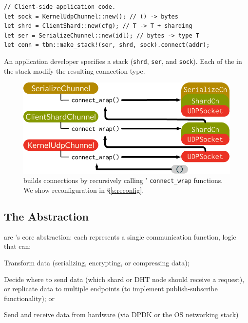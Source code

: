 \begin{listing}[t!]
\begin{verbatim}
// Client-side application code.
let sock = KernelUdpChunnel::new(); // () -> bytes
let shrd = ClientShard::new(cfg); // T -> T + sharding
let ser = SerializeChunnel::new(idl); // bytes -> type T
let conn = tbm::make_stack!(ser, shrd, sock).connect(addr);
\end{verbatim}
\vspace{-12pt}
\caption{An application developer specifies a \tunnel stack (\texttt{shrd}, \texttt{ser}, and \texttt{sock}). Each of the \tunnels in the stack modify the resulting connection type.}
\label{l:chunnel-stack}
\vspace{-10pt}
\end{listing}
\begin{figure}
    \centering
    \includegraphics[width=\columnwidth]{img/chunnel-panda-proposal}
    \vspace{2pt}
    \caption{\name builds connections by recursively calling \tunnels' \texttt{connect\_wrap} functions. We show reconfiguration in \S\ref{s:reconfig}.}
    \label{f:chunnel}
\end{figure}

\subsection{The \tunnel Abstraction}\label{s:chunnel}
\tunnels are \name's core abstraction: each \tunnel represents a single communication function, \ie logic that can:
\begin{inparaenum}[(a)]
\item Transform data (\eg serializing, encrypting, or compressing data);
\item Decide where to send data (\eg which shard or DHT node should receive a request), or replicate data to multiple endpoints (\eg to implement publish-subscribe functionality); or
\item Send and receive data from hardware (\eg via DPDK or the OS networking stack)
\end{inparaenum}

